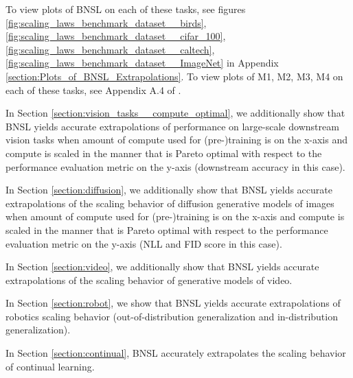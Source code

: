 \documentclass{article} %
\begin{document}
To view plots of BNSL on each of these tasks, see figures
\ref{fig:scaling_laws_benchmark_dataset__birds},
\ref{fig:scaling_laws_benchmark_dataset__cifar_100},
\ref{fig:scaling_laws_benchmark_dataset__caltech},
\ref{fig:scaling_laws_benchmark_dataset__ImageNet} in Appendix \ref{section:Plots_of_BNSL_Extrapolations}. To view plots of M1, M2, M3, M4 on each of these tasks, see Appendix A.4 of \cite{Alabdulmohsi2022revisiting}.

\vspace{-0.6mm}

In Section \ref{section:vision_tasks__compute_optimal}, we additionally show that BNSL yields accurate extrapolations of performance on large-scale downstream vision tasks when amount of compute used for (pre-)training is on the x-axis and compute is scaled in the manner that is Pareto optimal with respect to the performance evaluation metric on the y-axis (downstream accuracy in this case).

\vspace{-2.1mm}

In Section \ref{section:diffusion}, we additionally show that BNSL yields accurate extrapolations of the scaling behavior of diffusion generative models of images when amount of compute used for (pre-)training is on the x-axis and compute is scaled in the manner that is Pareto optimal with respect to the performance evaluation metric on the y-axis (NLL and FID score in this case).

\vspace{-2.1mm}

In Section \ref{section:video}, we additionally show that BNSL yields accurate extrapolations of the scaling behavior of generative models of video.

\vspace{-2.1mm}

In Section \ref{section:robot}, we show that BNSL yields accurate extrapolations of robotics scaling behavior (out-of-distribution generalization and in-distribution generalization).

\vspace{-2.1mm}


In Section \ref{section:continual}, BNSL accurately extrapolates the scaling behavior of continual learning.

\vspace{-2.1mm}
\end{document}
